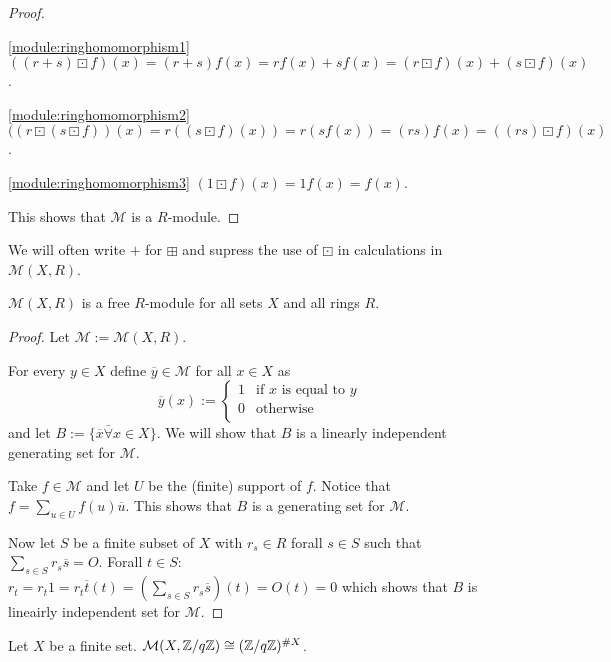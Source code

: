 \begin{proof}
\begin{namedlist}[\ref{module:ringhomomorphism3}]
		\item[\ref{module:ringhomomorphism1}] $((r+s)\boxdot f)(x) =
		(r+s)f(x) = rf(x) + sf(x) = (r\boxdot f)(x) + (s\boxdot f)(x)$.

		\item[\ref{module:ringhomomorphism2}] $((r\boxdot(s\boxdot f))(x) =
		r((s\boxdot f)(x)) = r(sf(x)) = (rs)f(x) = ((rs)\boxdot f)(x)$.
		
		\item[\ref{module:ringhomomorphism3}] $(1\boxdot f)(x) = 1f(x) =
		f(x)$. 
	\end{namedlist}
	
	This shows that $\mathcal{M}$ is a $R$-module.
\end{proof}

\begin{remark}
	We will often write $+$ for $\boxplus$ and supress the use of $\boxdot$
	in calculations in $\mathcal{M}(X,R)$.
\end{remark}

\begin{lemma}
	$\mathcal{M}(X,R)$ is a free $R$-module for all sets $X$ and all rings
	$R$.	
\end{lemma}

\begin{proof}
	Let $\mathcal{M}:=\mathcal{M}(X,R)$.
	
	For every $y\in X$ define $\overline{y}\in\mathcal{M}$  for all $x\in X$
	as
	\[
		\overline{y}(x):=\left\{
		\begin{array}{rl}
			1 & \text{if } x \text{ is equal to } y \\
			0 & \text{otherwise} \\		
		\end{array}
		\right.
	\]
	and let $B:=\{\overline{x}\bar\forall x\in X\}$. We will show that $B$
	is a linearly independent generating set for $\mathcal{M}$.
	
	Take $f\in\mathcal{M}$ and let $U$ be the (finite) support of $f$.
	Notice that $f=\sum_{u\in U} f(u)\overline{u}$. This shows that $B$ is a
	generating set for $\mathcal{M}$.
	
	Now let $S$ be a finite subset of $X$ with $r_{s}\in R$ forall $s\in S$
	such that $\sum_{s\in S} r_{s}\overline{s} = O$. Forall $t\in S$: $r_{t}
	= r_{t} 1 = r_{t} \overline{t}(t) = (\sum_{s\in S} r_{s}\overline{s})(t)
	= O(t) = 0$ which shows that $B$ is lineairly independent set for
	$\mathcal{M}$. 
\end{proof}

\begin{corollary}
	Let $X$ be a finite set. $\mathcal{M}(X,\mathbb{Z}/q\mathbb{Z})\cong
	(\mathbb{Z}/q\mathbb{Z})^{\#X}$.
\end{corollary}

